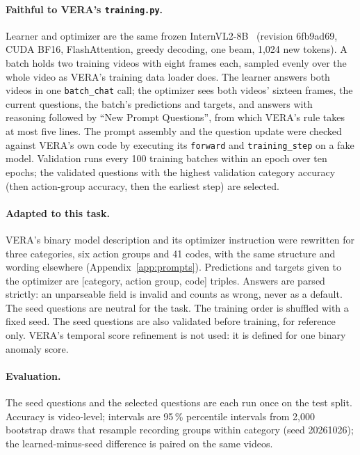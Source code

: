 \documentclass[11pt]{article}
\begin{document}
\paragraph{Faithful to VERA's \texttt{training.py}.} Learner and optimizer are the same frozen InternVL2-8B~\cite{chen2024internvl15} (revision 6fb9ad69, CUDA BF16, FlashAttention, greedy decoding, one beam, 1,024 new tokens). A batch holds two training videos with eight frames each, sampled evenly over the whole video as VERA's training data loader does. The learner answers both videos in one \texttt{batch\_chat} call; the optimizer sees both videos' sixteen frames, the current questions, the batch's predictions and targets, and answers with reasoning followed by ``New Prompt Questions'', from which VERA's rule takes at most five lines. The prompt assembly and the question update were checked against VERA's own code by executing its \texttt{forward} and \texttt{training\_step} on a fake model. Validation runs every 100 training batches within an epoch over ten epochs; the validated questions with the highest validation category accuracy (then action-group accuracy, then the earliest step) are selected.

\paragraph{Adapted to this task.} VERA's binary model description and its optimizer instruction were rewritten for three categories, six action groups and 41 codes, with the same structure and wording elsewhere (Appendix~\ref{app:prompts}). Predictions and targets given to the optimizer are [category, action group, code] triples. Answers are parsed strictly: an unparseable field is invalid and counts as wrong, never as a default. The seed questions are neutral for the task. The training order is shuffled with a fixed seed. The seed questions are also validated before training, for reference only. VERA's temporal score refinement is not used: it is defined for one binary anomaly score.

\paragraph{Evaluation.} The seed questions and the selected questions are each run once on the test split. Accuracy is video-level; intervals are 95\,\% percentile intervals from 2,000 bootstrap draws that resample recording groups within category (seed 20261026); the learned-minus-seed difference is paired on the same videos.
\end{document}
